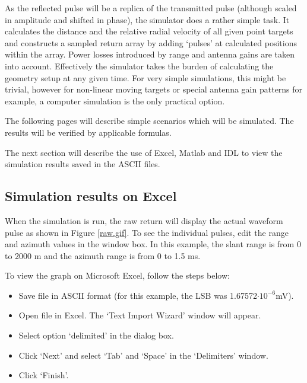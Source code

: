 As the reflected pulse will be a replica of the transmitted pulse (although
scaled in amplitude and shifted in phase), the simulator does a rather
simple task. It calculates the distance and the relative radial velocity of
all given point targets and constructs a sampled return array by adding
`pulses' at calculated positions within the array. Power losses introduced
by range and antenna gains are taken into account. Effectively the simulator
takes the burden of calculating the geometry setup at any given time. For
very simple simulations, this might be trivial, however for non-linear
moving targets or special antenna gain patterns for example, a computer
simulation is the only practical option.

The following pages will describe simple scenarios which will be simulated.
The results will be verified by applicable formulas.

\smallskip

\smallskip The next section will describe the use of Excel, Matlab and IDL
to view the simulation results saved in the ASCII files.%
\newpage%

\subsection{\protect\smallskip Simulation results on Excel}

When the simulation is run, the raw return will display the actual waveform
pulse as shown in Figure \ref{raw.gif}. To see the individual pulses, edit
the range and azimuth values in the window box. In this example, the slant
range is from 0 to 2000 m and the azimuth range is from 0 to 1.5 ms.

\smallskip To view the graph on Microsoft Excel, follow the steps below:

\begin{itemize}
\begin{itemize}
\item  Save file in ASCII format (for this example, the LSB was 1.67572$%
\cdot 10^{-6}$\thinspace mV).

\item  Open file in Excel. The `Text Import Wizard' window will appear.

\item  Select option `delimited' in the dialog box.

\item  Click `Next' and select `Tab' and `Space' in the `Delimiters' window.

\item  Click `Finish'.
\end{itemize}
\end{itemize}

